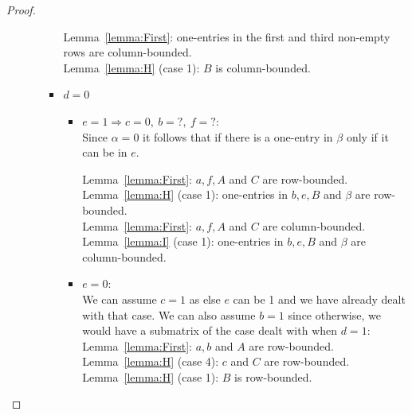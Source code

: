 \begin{proof}
\begin{itemize}
\begin{itemize}
\begin{itemize}
						Lemma~\ref{lemma:First}: one-entries in the first and third non-empty rows are column-bounded.\\
						Lemma~\ref{lemma:H} (case 1): $B$ is column-bounded.
					\item $d=0$
						\begin{itemize}
							\item $e=1\Rightarrow c=0,\ b=?,\ f=?$:\\
								Since $\alpha=0$ it follows that if there is a one-entry in $\beta$ only if it can be in $e$.
								
								Lemma~\ref{lemma:First}: $a,f,A$ and $C$ are row-bounded.\\
								Lemma~\ref{lemma:H} (case 1): one-entries in $b,e,B$ and $\beta$ are row-bounded. \\
								
								Lemma~\ref{lemma:First}: $a,f,A$ and $C$ are column-bounded.\\
								Lemma~\ref{lemma:I} (case 1): one-entries in $b,e,B$ and $\beta$ are column-bounded.
							\item $e=0$:\\
								We can assume $c=1$ as else $e$ can be 1 and we have already dealt with that case. We can also assume $b=1$ since otherwise, we would have a submatrix of the case dealt with when $d=1$:\\
								Lemma~\ref{lemma:First}: $a,b$ and $A$ are row-bounded.\\
								Lemma~\ref{lemma:H} (case 4): $c$ and $C$ are row-bounded.\\
								Lemma~\ref{lemma:H} (case 1): $B$ is row-bounded.\\
										

\end{itemize}
\end{itemize}
\end{itemize}
\end{itemize}
\end{proof}

